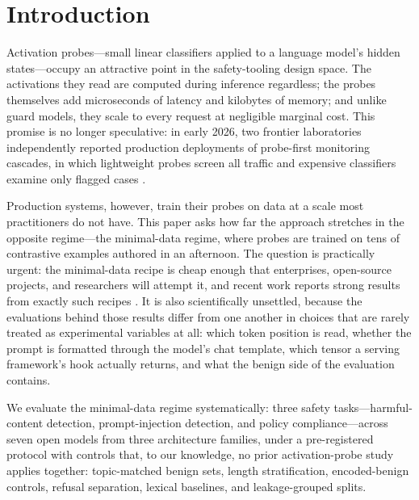 \section{Introduction}
\label{sec:intro}

Activation probes---small linear classifiers applied to a language model's hidden states---occupy an attractive point
in the safety-tooling design space. The activations they read are computed during inference regardless; the probes
themselves add microseconds of latency and kilobytes of memory; and unlike guard models, they scale to every request
at negligible marginal cost. This promise is no longer speculative: in early 2026, two frontier laboratories
independently reported production deployments of probe-first monitoring cascades, in which lightweight probes screen
all traffic and expensive classifiers examine only flagged cases \cite{cunningham2026classifiers, gdm2026probes}.

Production systems, however, train their probes on data at a scale most practitioners do not have. This paper asks how
far the approach stretches in the opposite regime---the minimal-data regime, where probes are trained on tens of
contrastive examples authored in an afternoon. The question is practically urgent: the minimal-data recipe is cheap
enough that enterprises, open-source projects, and researchers will attempt it, and recent work reports strong results
from exactly such recipes \cite{han2025safeswitch, conceptguard2025, mckenzie2025probes}. It is also scientifically
unsettled, because the evaluations behind those results differ from one another in choices that are rarely treated as
experimental variables at all: which token position is read, whether the prompt is formatted through the model's chat
template, which tensor a serving framework's hook actually returns, and what the benign side of the evaluation
contains.

We evaluate the minimal-data regime systematically: three safety tasks---harmful-content detection, prompt-injection
detection, and policy compliance---across seven open models from three architecture families, under a pre-registered
protocol with controls that, to our knowledge, no prior activation-probe study applies together: topic-matched benign
sets, length stratification, encoded-benign controls, refusal separation, lexical baselines, and leakage-grouped
splits.

